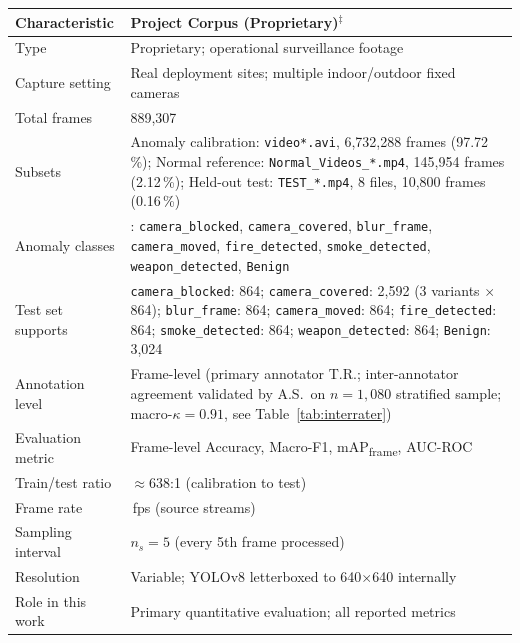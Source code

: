 \documentclass[a4paper,fleqn]{cas-dc}
\begin{document}
\begin{table}[!ht]
\begin{tabularx}{\linewidth}{p{2.5cm} >{\raggedright\arraybackslash}X}
\toprule
\textbf{Characteristic} & \textbf{Project Corpus (Proprietary)}$^\ddagger$ \\
\midrule
Type              & Proprietary; operational surveillance footage \\
Capture setting   & Real deployment sites; multiple indoor/outdoor fixed cameras \\
Total frames      & 6{,}889{,}307 \\
Subsets           & Anomaly calibration: \texttt{video*.avi}, 6{,}732{,}288 frames (97.72\,\%);
                    Normal reference: \texttt{Normal\_Videos\_*.mp4}, 145{,}954 frames (2.12\,\%);
                    Held-out test: \texttt{TEST\_*.mp4}, 8 files, 10{,}800 frames (0.16\,\%) \\
Anomaly classes   & 8: \texttt{camera\_blocked}, \texttt{camera\_covered}, \texttt{blur\_frame},
                    \texttt{camera\_moved}, \texttt{fire\_detected}, \texttt{smoke\_detected},
                    \texttt{weapon\_detected}, \texttt{Benign} \\
Test set supports & \texttt{camera\_blocked}: 864; \texttt{camera\_covered}: 2{,}592
                    (3 variants $\times$ 864); \texttt{blur\_frame}: 864;
                    \texttt{camera\_moved}: 864; \texttt{fire\_detected}: 864;
                    \texttt{smoke\_detected}: 864; \texttt{weapon\_detected}: 864;
                    \texttt{Benign}: 3{,}024 \\
Annotation level  & Frame-level (primary annotator T.R.; inter-annotator agreement validated by A.S.\ on $n{=}1{,}080$ stratified sample; macro-$\kappa = 0.91$, see Table~\ref{tab:interrater}) \\
Evaluation metric & Frame-level Accuracy, Macro-F1, mAP\textsubscript{frame}, AUC-ROC \\
Train/test ratio  & $\approx$638:1 (calibration to test) \\
Frame rate        & 25\,fps (source streams) \\
Sampling interval & $n_s = 5$ (every 5th frame processed) \\
Resolution        & Variable; YOLOv8 letterboxed to 640$\times$640 internally \\
Role in this work & Primary quantitative evaluation; all reported metrics \\
\bottomrule
\end{tabularx}
\end{table}
 
\end{document}
